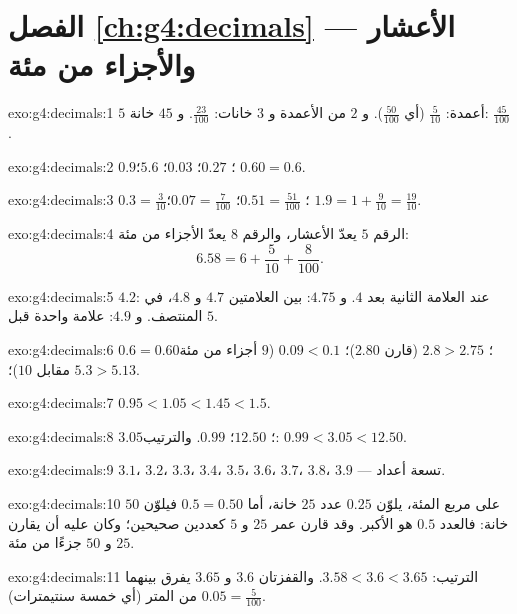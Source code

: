 \section*{الفصل \ref{ch:g4:decimals} --- الأعشار والأجزاء من مئة}

\begin{solution}{exo:g4:decimals:1}
$5$ أعمدة: $\frac{5}{10}$ (أي $\frac{50}{100}$). و $2$ من الأعمدة
و $3$ خانات: $\frac{23}{100}$. و $45$ خانة: $\frac{45}{100}$.
\end{solution}

\begin{solution}{exo:g4:decimals:2}
$0.9$؛ \quad $0.27$؛ \quad $0.03$؛ \quad $5.6$؛ \quad
$0.60 = 0.6$.
\end{solution}

\begin{solution}{exo:g4:decimals:3}
$0.3 = \frac{3}{10}$؛ \quad $0.51 = \frac{51}{100}$؛ \quad
$0.07 = \frac{7}{100}$؛ \quad $1.9 = 1 + \frac{9}{10} =
\frac{19}{10}$.
\end{solution}

\begin{solution}{exo:g4:decimals:4}
الرقم $5$ يعدّ الأعشار، والرقم $8$ يعدّ الأجزاء من مئة:
\[
6.58 = 6 + \frac{5}{10} + \frac{8}{100}.
\]
\end{solution}

\begin{solution}{exo:g4:decimals:5}
$4.2$: عند العلامة الثانية بعد $4$. و $4.75$: بين العلامتين
$4.7$ و $4.8$، في المنتصف. و $4.9$: علامة واحدة قبل $5$.
\end{solution}

\begin{solution}{exo:g4:decimals:6}
$0.6 = 0.60$؛ \quad $2.8 > 2.75$ (قارن $2.80$)؛ \quad
$0.09 < 0.1$ ($9$ أجزاء من مئة مقابل $10$)؛ \quad
$5.3 > 5.13$.
\end{solution}

\begin{solution}{exo:g4:decimals:7}
$0.95 < 1.05 < 1.45 < 1.5$.
\end{solution}

\begin{solution}{exo:g4:decimals:8}
$3.05$؛ \quad $12.50$؛ \quad $0.99$. والترتيب:
$0.99 < 3.05 < 12.50$.
\end{solution}

\begin{solution}{exo:g4:decimals:9}
$3.1$، $3.2$، $3.3$، $3.4$، $3.5$، $3.6$، $3.7$، $3.8$، $3.9$ ---
تسعة أعداد.
\end{solution}

\begin{solution}{exo:g4:decimals:10}
على مربع المئة، يلوّن $0.25$ عدد $25$ خانة، أما $0.5 = 0.50$
فيلوّن $50$ خانة: فالعدد $0.5$ هو الأكبر. وقد قارن عمر $25$ و
$5$ كعددين صحيحين؛ وكان عليه أن يقارن $25$ و $50$ جزءًا من مئة.
\end{solution}

\begin{solution}{exo:g4:decimals:11}
الترتيب: $3.58 < 3.6 < 3.65$. والقفزتان $3.6$ و $3.65$ يفرق
بينهما $0.05 = \frac{5}{100}$ من المتر (أي خمسة سنتيمترات).
\end{solution}
